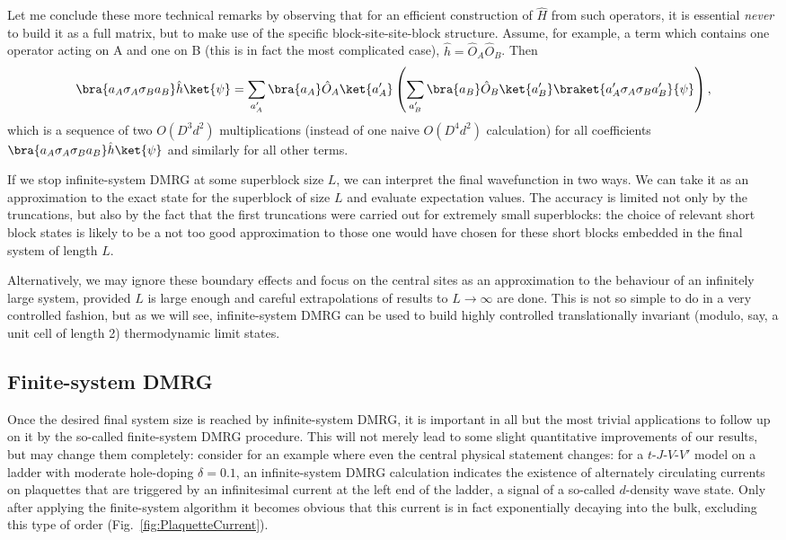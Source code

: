 Let me conclude these more technical remarks by observing that for an efficient construction of  $\hat{H}$ from such operators, it is essential {\em never} to build it as a full matrix, but to make use of the specific block-site-site-block structure. Assume, for example, a term which contains one operator acting on A and one on B (this is in fact the most complicated case), $\hat{h}=\hat{O}_A \hat{O}_B$. Then
\begin{equation}
\bra{a_A \sigma_A \sigma_B a_B} \hat{h}\ket{\psi} = \sum_{a'_A} 
\bra{a_A}\hat{O}_A\ket{a'_A} \left( \sum_{a'_B} \bra{a_B}\hat{O}_B\ket{a'_B}  \braket{a'_A \sigma_A \sigma_B a'_B}{\psi} \right),
\label{eq:hamfragment}
\end{equation}
which is a sequence of two $O(D^3 d^2)$ multiplications (instead of one naive $O( D^4 d^2)$ calculation) for all coefficients $\bra{a_A \sigma_A \sigma_B a_B} \hat{h}\ket{\psi}$ and similarly for all other terms.

If we stop infinite-system DMRG at some superblock size $L$, we can interpret the final wavefunction in two ways. We can take it as an approximation to the exact state for the superblock of size $L$ and evaluate expectation values. The accuracy is limited not only by the truncations, but also by the fact that the first truncations were carried out for extremely small superblocks: the choice of relevant short block states is likely to be a not too good approximation to those one would have chosen for these short blocks embedded in the final system of length $L$.

Alternatively, we may ignore these boundary effects and focus on the central sites as an approximation to the behaviour of an infinitely large system, provided $L$ is large enough and careful extrapolations of results to $L\rightarrow\infty$ are done. This is not so simple to do in a very controlled fashion, but as we will see, infinite-system DMRG can be used to build highly controlled translationally invariant (modulo, say, a unit cell of length 2) thermodynamic limit states.

\subsection{Finite-system DMRG}

Once the desired final system size is reached by infinite-system DMRG, it is important in all but the most trivial applications to follow up on it by the so-called finite-system DMRG procedure. This will not merely lead to some slight quantitative improvements of our results, but may change them completely: consider \cite{Schollwoeck03} for an example where even the central physical statement changes: for a $t$-$J$-$V$-$V'$ model on a ladder with moderate hole-doping $\delta=0.1$, an infinite-system DMRG calculation indicates the existence of alternately circulating currents on plaquettes that are triggered by an infinitesimal current at the left end of the ladder, a signal of a so-called $d$-density wave state. Only after applying the finite-system algorithm it becomes obvious that this current is in fact exponentially decaying into the bulk, excluding this type of order (Fig.~\ref{fig:PlaquetteCurrent}). 

